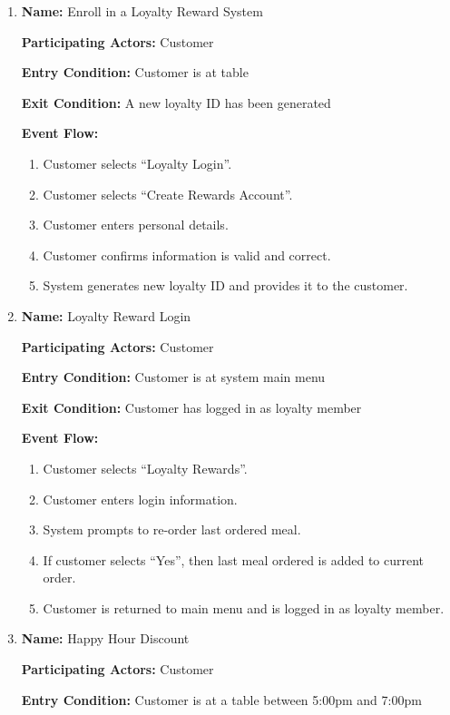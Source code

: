 \documentclass[11pt]{article}
\begin{document}
\begin{enumerate}
		\newpage

		\item \textbf{Name:} 				Enroll in a Loyalty Reward System

			\textbf{Participating Actors:} 	Customer

			\textbf{Entry Condition:} 		Customer is at table

			\textbf{Exit Condition:} 		A new loyalty ID has been generated

			\textbf{Event Flow:}
			\begin{enumerate}
				\setlength{\leftskip}{1cm}
				\item Customer selects ``Loyalty Login''.
				\item Customer selects ``Create Rewards Account''.
				\item Customer enters personal details.
				\item Customer confirms information is valid and correct.
				\item System generates new loyalty ID and provides it to the customer.\\
			\end{enumerate}

		\item \textbf{Name:} 				Loyalty Reward Login

			\textbf{Participating Actors:} 	Customer

			\textbf{Entry Condition:} 		Customer is at system main menu

			\textbf{Exit Condition:} 		Customer has logged in as loyalty member

			\textbf{Event Flow:}
			\begin{enumerate}
				\setlength{\leftskip}{1cm}
				\item Customer selects ``Loyalty Rewards''.
				\item Customer enters login information.
				\item System prompts to re-order last ordered meal.
				\item If customer selects ``Yes'', then last meal ordered is added to current order.
				\item Customer is returned to main menu and is logged in as loyalty member.
			\end{enumerate}

		\item \textbf{Name:} 				Happy Hour Discount

			\textbf{Participating Actors:} 	Customer

			\textbf{Entry Condition:} 		Customer is at a table between 5:00pm and 7:00pm


\end{enumerate}
\end{document}
